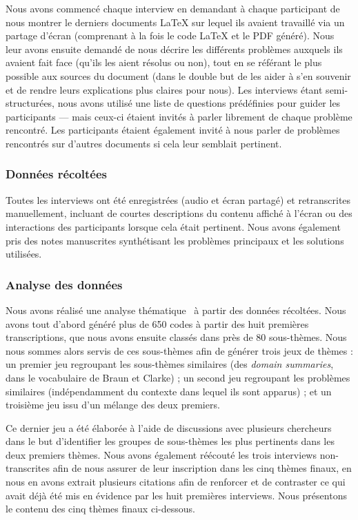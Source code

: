 Nous avons commencé chaque interview en demandant à chaque participant de nous montrer le derniers documents \LaTeX{} sur lequel ils avaient travaillé via un partage d'écran (comprenant à la fois le code \LaTeX{} et le PDF généré).
Nous leur avons ensuite demandé de nous décrire les différents problèmes auxquels ils avaient fait face (qu'ils les aient résolus ou non), tout en se référant le plus possible aux sources du document (dans le double but de les aider à s'en souvenir et de rendre leurs explications plus claires pour nous).
Les interviews étant semi-structurées, nous avons utilisé une liste de questions prédéfinies pour guider les participants --- mais ceux-ci étaient invités à parler librement de chaque problème rencontré.
Les participants étaient également invité à nous parler de problèmes rencontrés sur d'autres documents si cela leur semblait pertinent.

\subsubsection{Données récoltées}
Toutes les interviews ont été enregistrées (audio et écran partagé) et retranscrites manuellement, incluant de courtes descriptions du contenu affiché à l'écran ou des interactions des participants lorsque cela était pertinent.
Nous avons également pris des notes manuscrites synthétisant les problèmes principaux et les solutions utilisées.

\subsubsection{Analyse des données}
\label{sssec:collecte-analyse-donnees}
Nous avons réalisé une analyse thématique~\cite{braun2019reflecting} à partir des données récoltées.
Nous avons tout d'abord généré plus de 650 codes à partir des huit premières transcriptions, que nous avons ensuite classés dans près de 80 sous-thèmes.
Nous nous sommes alors servis de ces sous-thèmes afin de générer trois jeux de thèmes :
un premier jeu regroupant les sous-thèmes similaires (\ie des \emph{domain summaries}, dans le vocabulaire de Braun et Clarke) ;
un second jeu regroupant les problèmes similaires (indépendamment du contexte dans lequel ils sont apparus) ;
et un troisième jeu issu d'un mélange des deux premiers.

Ce dernier jeu a été élaborée à l'aide de discussions avec plusieurs chercheurs dans le but d'identifier les groupes de sous-thèmes les plus pertinents dans les deux premiers thèmes.
Nous avons également réécouté les trois interviews non-transcrites afin de nous assurer de leur inscription dans les cinq thèmes finaux, en nous en avons extrait plusieurs citations afin de renforcer et de contraster ce qui avait déjà été mis en évidence par les huit premières interviews.
Nous présentons le contenu des cinq thèmes finaux ci-dessous.




